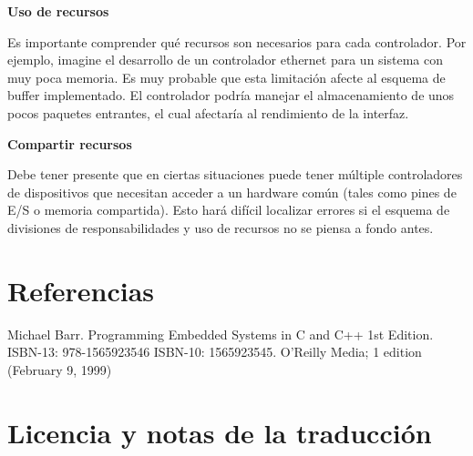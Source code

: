 \documentclass[output=paper, 
colorlinks,
citecolor=brown,
newtxmath
]{langscibook}
\begin{document}
\textbf{Uso de recursos}

Es importante comprender qué recursos son necesarios para cada controlador.
Por ejemplo, imagine el desarrollo de un controlador ethernet para un 
sistema con muy poca memoria.
Es muy probable que esta limitación afecte al esquema de buffer implementado.
El controlador podría manejar el almacenamiento de unos
pocos paquetes entrantes, el cual afectaría al rendimiento de la 
interfaz.

\textbf{Compartir recursos}

Debe tener presente que en ciertas situaciones puede tener múltiple
controladores de dispositivos que necesitan acceder a un hardware común 
(tales como pines de E/S o memoria compartida).
Esto hará difícil localizar errores si el
esquema de divisiones de responsabilidades y uso de recursos
no se piensa a fondo antes.











 
\section{Referencias}

Michael Barr. Programming Embedded Systems in C and C++ 1st Edition. ISBN-13: 978-1565923546
ISBN-10: 1565923545. O'Reilly Media; 1 edition (February 9, 1999)


\section {Licencia y notas de la traducción}
\end{document}
